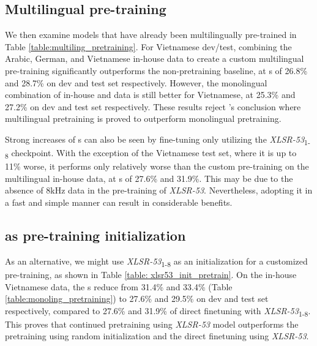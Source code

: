 \subsection{Multilingual pre-training}



We then examine models that have already been multilingually pre-trained in Table \ref{table:multiling_pretraining}. 
For Vietnamese dev/test, combining the Arabic, German, and Vietnamese in-house data to create a custom multilingual pre-training significantly outperforms the non-pretraining baseline, at s of 26.8\% and 28.7\% on dev and test set respectively. 
However, the monolingual combination of in-house and  data is still better for Vietnamese, at 25.3\% and 27.2\% on dev and test set respectively.
These results reject \cite{xlsr53}'s conclusion where multilingual pretraining is proved to outperform monolingual pretraining.

Strong increases of s can also be seen by fine-tuning only utilizing the \textit{XLSR-53}\textsubscript{1-8} checkpoint. 
With the exception of the Vietnamese test set, where it is up to 11\% worse, it performs only relatively worse than the custom pre-training on the multilingual in-house data, at s of 27.6\% and 31.9\%.
This may be due to the absence of 8kHz data in the pre-training of \textit{XLSR-53}. 
Nevertheless, adopting it in a fast and simple manner can result in considerable benefits.


\subsection{ as pre-training initialization}



As an alternative, we might use \textit{XLSR-53}\textsubscript{1-8} as an initialization for a customized pre-training, as shown in Table \ref{table: xlsr53_init_pretrain}. 
On the in-house Vietnamese data, the s reduce from 31.4\% and 33.4\% (Table \ref{table:monoling_pretraining}) to 27.6\% and 29.5\% on dev and test set respectively, compared to 27.6\% and 31.9\% of direct finetuning with \textit{XLSR-53}\textsubscript{1-8}.
This proves that continued pretraining using \textit{XLSR-53} model outperforms the pretraining using random initialization and the direct finetuning using \textit{XLSR-53}.

